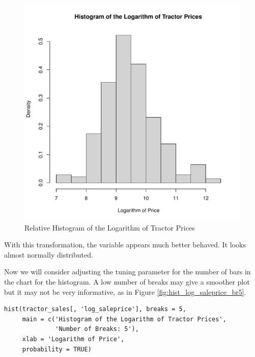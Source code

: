 \documentclass[11pt]{book}
\begin{document}
\begin{figure}[h!]
  \centering
  \includegraphics[scale = 0.5, keepaspectratio=true]{../Figures/hist_log_saleprice}
  \caption{Relative Histogram of the Logarithm of Tractor Prices} \label{fig:hist_log_saleprice}
\end{figure}

With this transformation, the variable appears much better behaved.
It looks almost normally distributed.

Now we will consider adjusting the tuning parameter for the number of
bars in the chart for the histogram.
%
A low number of breaks may give a smoother plot but
it may not be very informative, as in Figure \ref{fig:hist_log_saleprice_br5}.

\begin{verbatim}
hist(tractor_sales[, 'log_saleprice'], breaks = 5,
     main = c('Histogram of the Logarithm of Tractor Prices',
              'Number of Breaks: 5'),
     xlab = 'Logarithm of Price',
     probability = TRUE)
\end{verbatim}
\end{document}
